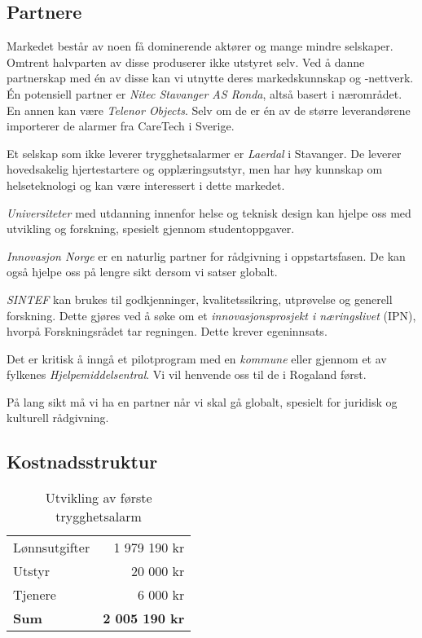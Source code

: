 \subsection{Partnere}


Markedet består av noen få dominerende aktører og mange mindre selskaper.
Omtrent halvparten av disse produserer ikke utstyret selv. Ved å danne
partnerskap med én av disse kan vi utnytte deres markedskunnskap og -nettverk.
Én potensiell partner er \textit{Nitec Stavanger AS Ronda}, altså basert i
nærområdet.  En annen kan være \textit{Telenor Objects}. Selv om de er én av de
større leverandørene importerer de alarmer fra CareTech i Sverige.

Et selskap som ikke leverer trygghetsalarmer er \textit{Laerdal} i Stavanger.
De leverer hovedsakelig hjertestartere og opplæringsutstyr, men har høy
kunnskap om helseteknologi og kan være interessert i dette markedet.

\textit{Universiteter} med utdanning innenfor helse og teknisk design kan
hjelpe oss med utvikling og forskning, spesielt gjennom studentoppgaver.

\textit{Innovasjon Norge} er en naturlig partner for rådgivning i
oppstartsfasen. De kan også hjelpe oss på lengre sikt dersom vi satser globalt.

\textit{SINTEF} kan brukes til godkjenninger, kvalitetssikring, utprøvelse og
generell forskning. Dette gjøres ved å søke om et \textit{innovasjonsprosjekt i
næringslivet} (IPN), hvorpå Forskningsrådet tar regningen. Dette krever
egeninnsats.

Det er kritisk å inngå et pilotprogram med en \textit{kommune} eller gjennom et av
fylkenes \textit{Hjelpemiddelsentral}. Vi vil henvende oss til de i Rogaland først.

På lang sikt må vi ha en partner når vi skal gå globalt, spesielt for juridisk
og kulturell rådgivning.

\subsection{Kostnadsstruktur}


\begin{table}[h]
  \begin{tabular}{lr}
    Lønnsutgifter        &  1 979 190 kr \\
    Utstyr               &     20 000 kr \\
    Tjenere              &      6 000 kr \\
    \textbf{Sum}  & \textbf{2 005 190 kr} \\
  \end{tabular}
  \caption{Utvikling av første trygghetsalarm}
  \label{table.kostnad.alarm}
\end{table}

